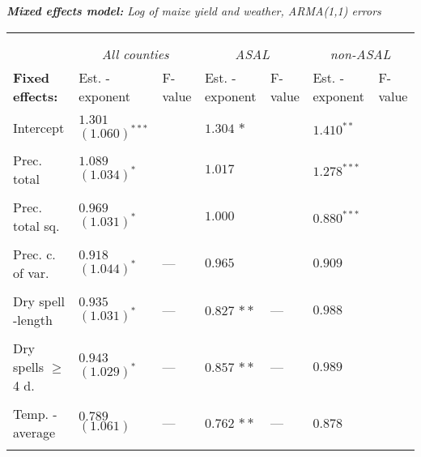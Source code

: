 \documentclass[a4paper,12pt]{article}
\begin{document}
{\hspace{-1.5cm}
\begin{threeparttable}
\singlespacing
\caption{\textit{\textbf{Mixed  effects model:} Log of maize yield and weather, ARMA(1,1) errors}}
\label{KenARe11} 
\begin{footnotesize}

\begin{tabular}{lllllll} 

\hline \vspace{-0.2cm} \\
\vspace{-0.2cm} \\
  \multicolumn{1}{l}{\vspace{0.1cm}\textbf{ }}  &\multicolumn{2}{c}{\textit{All counties}} &\multicolumn{2}{c}{\textit{ASAL}} &\multicolumn{2}{c}{\textit{non-ASAL}}\\
    \multicolumn{1}{l}{\vspace{0.1cm}\textbf{Fixed effects:}}&Est. - exponent&F-value&Est. - exponent&F-value&Est. - exponent&F-value\\
 \hline 
\hline
\\
\vspace{-0.2cm}Intercept&$1.301$ $(1.060)^{***}$&&$1.304$ ${*}$&&$1.410^{**}$&\\
  \\
\vspace{-0.2cm}Prec. total&$1.089$ $(1.034)^{*}$&&$1.017$&&$1.278^{***}$&\\
  \\
  \vspace{-0.2cm}Prec. total sq.&$0.969$ $(1.031)^{*}$&&$1.000$ &&$0.880^{***}$&\\
    \\
      \vspace{-0.2cm}Prec. c. of var.&$0.918$ $(1.044)^{*}$&---&$0.965$ &&$0.909^{}$\\
  \\

         \vspace{-0.2cm}Dry spell -length&$0.935$ $(1.031)^{*}$&---&$0.827$ ${**}$&---&$ 0.988^{}$&\\
  \\
        \vspace{-0.2cm}Dry spells 	$\geq$ 4 d.&$0.943$ $(1.029)^{*}$&---&$0.857$ ${**}$&---&$0.989^{}$&\\
  \\
          \vspace{-0.2cm}Temp. - average&$0.789$ $(1.061)^{}$&---&$0.762$ ${**}$&---&$0.878$ $^{}$&\\
  \\
  

\end{tabular}
\end{footnotesize}
\end{threeparttable}}
\end{document}
